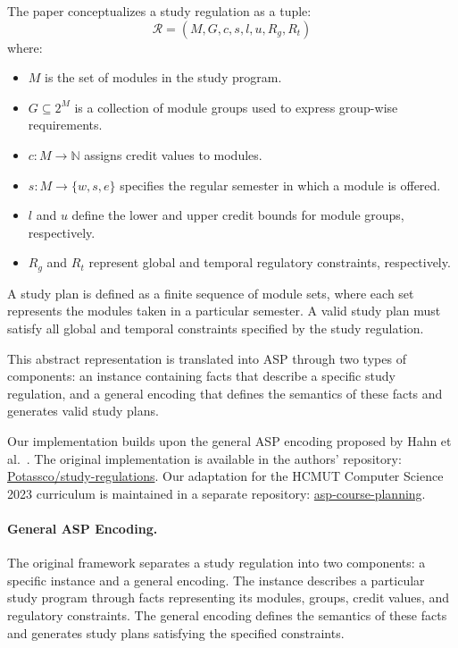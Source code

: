 \documentclass[10pt,a4paper]{article}
\begin{document}
The paper conceptualizes a study regulation as a tuple:
\[
\mathcal{R} = (M,G,c,s,l,u,R_g,R_t)
\]
where:
\begin{itemize}
    \item $M$ is the set of modules in the study program.
    \item $G \subseteq 2^M$ is a collection of module groups used to express group-wise requirements.
    \item $c : M \rightarrow \mathbb{N}$ assigns credit values to modules.
    \item $s : M \rightarrow \{w,s,e\}$ specifies the regular semester in which a module is offered.
    \item $l$ and $u$ define the lower and upper credit bounds for module groups, respectively.
    \item $R_g$ and $R_t$ represent global and temporal regulatory constraints, respectively.
\end{itemize}

A study plan is defined as a finite sequence of module sets, where each set represents the modules taken in a particular semester. A valid study plan must satisfy all global and temporal constraints specified by the study regulation.

This abstract representation is translated into ASP through two types of components: an instance containing facts that describe a specific study regulation, and a general encoding that defines the semantics of these facts and generates valid study plans.


Our implementation builds upon the general ASP encoding proposed by Hahn et al.~\cite{hahn2024reasoning}. The original implementation is available in the authors' repository:
\href{https://github.com/potassco/study-regulations}{Potassco/study-regulations}.
Our adaptation for the HCMUT Computer Science 2023 curriculum is maintained in a separate repository:
\href{https://github.com/kqyuu22/asp-course-planning}{asp-course-planning}.

\paragraph{General ASP Encoding.}
The original framework separates a study regulation into two components: a specific instance and a general encoding. The instance describes a particular study program through facts representing its modules, groups, credit values, and regulatory constraints. The general encoding defines the semantics of these facts and generates study plans satisfying the specified constraints.
\end{document}
